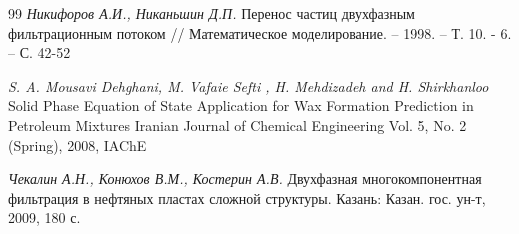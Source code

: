 \documentclass[12pt,twoside,a4paper]{uz_ku}
\begin{document}
\begin{thebibliography}{99}
\textit {Никифоров А.И., Никаньшин Д.П.} Перенос частиц двухфазным фильтрационным потоком // Математическое моделирование. – 1998. – Т. 10. - 6. – С. 42-52

\textit {S. A. Mousavi Dehghani, M. Vafaie Sefti , H. Mehdizadeh and H. Shirkhanloo} Solid Phase Equation of State Application for Wax Formation Prediction in Petroleum Mixtures Iranian Journal of Chemical Engineering Vol. 5, No. 2 (Spring), 2008, IAChE

\textit{Чекалин А.Н., Конюхов В.М., Костерин А.В.} Двухфазная многокомпонентная фильтрация в нефтяных пластах сложной структуры. Казань: Казан. гос. ун-т, 2009, 180 с.
\end{thebibliography}

\end{document}
